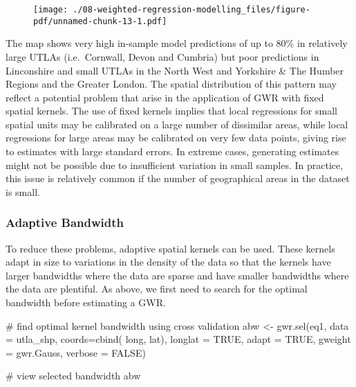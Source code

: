 \documentclass[
  letterpaper,
  krantz2]{style/krantz}
\newenvironment{Shaded}{\begin{snugshade}}{\end{snugshade}}
\newcommand{\AttributeTok}[1]{\textcolor[rgb]{0.40,0.45,0.13}{#1}}
\newcommand{\CommentTok}[1]{\textcolor[rgb]{0.37,0.37,0.37}{#1}}
\newcommand{\ConstantTok}[1]{\textcolor[rgb]{0.56,0.35,0.01}{#1}}
\newcommand{\FunctionTok}[1]{\textcolor[rgb]{0.28,0.35,0.67}{#1}}
\newcommand{\NormalTok}[1]{\textcolor[rgb]{0.00,0.23,0.31}{#1}}
\newcommand{\OtherTok}[1]{\textcolor[rgb]{0.00,0.23,0.31}{#1}}
\begin{document}
\begin{figure}[H]

{\centering \texttt{[image: ./08-weighted-regression-modelling\_files/figure-pdf/unnamed-chunk-13-1.pdf]}

}

\end{figure}

The map shows very high in-sample model predictions of up to 80\% in
relatively large UTLAs (i.e.~Cornwall, Devon and Cumbria) but poor
predictions in Linconshire and small UTLAs in the North West and
Yorkshire \& The Humber Regions and the Greater London. The spatial
distribution of this pattern may reflect a potential problem that arise
in the application of GWR with fixed spatial kernels. The use of fixed
kernels implies that local regressions for small spatial units may be
calibrated on a large number of dissimilar areas, while local
regressions for large areas may be calibrated on very few data points,
giving rise to estimates with large standard errors. In extreme cases,
generating estimates might not be possible due to insufficient variation
in small samples. In practice, this issue is relatively common if the
number of geographical areas in the dataset is small.

\hypertarget{adaptive-bandwidth}{%
\subsubsection{Adaptive Bandwidth}\label{adaptive-bandwidth}}

To reduce these problems, adaptive spatial kernels can be used. These
kernels adapt in size to variations in the density of the data so that
the kernels have larger bandwidths where the data are sparse and have
smaller bandwidths where the data are plentiful. As above, we first need
to search for the optimal bandwidth before estimating a GWR.

\begin{Shaded}
\begin{Highlighting}[]
\CommentTok{\# find optimal kernel bandwidth using cross validation}
\NormalTok{abw }\OtherTok{\textless{}{-}} \FunctionTok{gwr.sel}\NormalTok{(eq1, }
               \AttributeTok{data =}\NormalTok{ utla\_shp, }
               \AttributeTok{coords=}\FunctionTok{cbind}\NormalTok{( long, lat),}
               \AttributeTok{longlat =} \ConstantTok{TRUE}\NormalTok{,}
               \AttributeTok{adapt =} \ConstantTok{TRUE}\NormalTok{, }
               \AttributeTok{gweight =}\NormalTok{ gwr.Gauss, }
               \AttributeTok{verbose =} \ConstantTok{FALSE}\NormalTok{)}

\CommentTok{\# view selected bandwidth}
\NormalTok{abw}
\end{Highlighting}
\end{Shaded}
\end{document}
